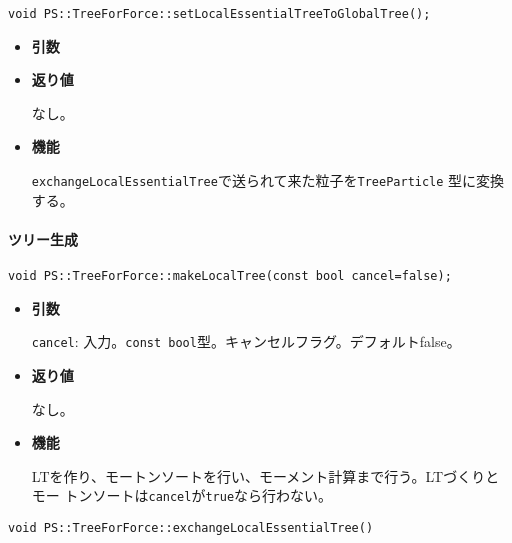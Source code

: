 \begin{screen}
\begin{verbatim}
void PS::TreeForForce::setLocalEssentialTreeToGlobalTree();

\end{verbatim}
\end{screen}

\begin{itemize}

\item{{\bf 引数}}

\item{{\bf 返り値}}

なし。

\item{{\bf 機能}}

{\tt exchangeLocalEssentialTree}で送られて来た粒子を{\tt TreeParticle}
型に変換する。

\end{itemize}

\paragraph{ツリー生成}
\mbox{}

\begin{screen}
\begin{verbatim}
void PS::TreeForForce::makeLocalTree(const bool cancel=false);
\end{verbatim}
\end{screen}

\begin{itemize}

\item{{\bf 引数}}

{\tt cancel}: 入力。{\tt const bool}型。キャンセルフラグ。デフォルトfalse。

\item{{\bf 返り値}}

なし。

\item{{\bf 機能}}

LTを作り、モートンソートを行い、モーメント計算まで行う。LTづくりとモー
トンソートは{\tt cancel}が{\tt true}なら行わない。

\end{itemize}



\begin{screen}
\begin{verbatim}
void PS::TreeForForce::exchangeLocalEssentialTree()

\end{verbatim}
\end{screen}

